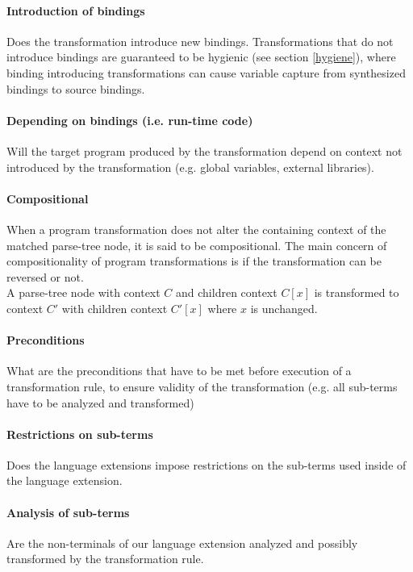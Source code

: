 \paragraph{Introduction of bindings}
Does the transformation introduce new bindings. Transformations that do not introduce bindings are guaranteed to be hygienic (see section \ref{hygiene}), where binding introducing transformations can cause variable capture from synthesized bindings to source bindings.

\paragraph{Depending on bindings (i.e. run-time code)}
Will the target program produced by the transformation depend on context not introduced by the transformation (e.g. global variables, external libraries).

\paragraph{Compositional}
When a program transformation does not alter the containing context of the matched parse-tree node, it is said to be compositional. The main concern of compositionality of program transformations is if the transformation can be reversed or not.
\\ 
A parse-tree node with context $C$ and children context $C[x]$ is transformed to context $C'$ with children context $C'[x]$ where $x$ is unchanged.

\paragraph{Preconditions}
What are the preconditions that have to be met before execution of a transformation rule, to ensure validity of the transformation (e.g. all sub-terms have to be analyzed and transformed)

\paragraph{Restrictions on sub-terms}
Does the language extensions impose restrictions on the sub-terms used inside of the language extension. 

\paragraph{Analysis of sub-terms}
Are the non-terminals of our language extension analyzed and possibly transformed by the transformation rule.

